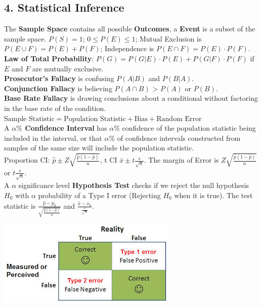 \begin{multicols*}{3}
\subsection{4. Statistical Inference}
The \textbf{Sample Space} contains all possible \textbf{Outcomes}, a \textbf{Event} is a subset of the sample space.
$P(S) = 1$; $0\leq P(E)\leq1$; Mutual Exclusion is $P(E \cup F)=P(E)+P(F)$; Independence is $P(E\cap F)=P(E)\cdot P(F)$.\\
\textbf{Law of Total Probability}: $P(G)=P(G|E)\cdot P(E)+P(G|F)\cdot P(F)$ if $E$ and $F$ are mutually exclusive.\\
\textbf{Prosecutor's Fallacy} is confusing $P(A|B)$ and $P(B|A)$.\\
\textbf{Conjunction Fallacy} is believing $P(A\cap B)$ > $P(A)$ or $P(B)$.\\
\textbf{Base Rate Fallacy} is drawing conclusions about a conditional without factoring in the base rate of the condition.\\
$\text{Sample Statistic}=\text{Population Statistic}+\text{Bias}+\text{Random Error}$\\
A \textbf{$\alpha\%$ Confidence Interval} has $\alpha\%$ confidence of the population statistic being included in the interval, or that $\alpha\%$ of confidence intervals constructed from samples of the same size will include the population statistic.\\ 
Proportion CI: $\hat{p}\pm Z\sqrt{\frac{\hat{p}(1-\hat{p})}{n}}$, t CI $\bar{x}\pm t\frac{s}{\sqrt{n}}$. The margin of Error is $Z\sqrt{\frac{\hat{p}(1-\hat{p})}{n}}$ or $t\frac{s}{\sqrt{n}}$.\\
A $\alpha$ significance level \textbf{Hypothesis Test} checks if we reject the null hypothesis $H_0$ with $\alpha$ probability of a Type I error (Rejecting $H_0$ when it is true). The test statistic is $\frac{\hat{p}-p_0}{\sqrt{\frac{\hat{p}(1-\hat{p})}{n}}}$ and $\frac{\bar{x}-x_0}{\frac{s}{\sqrt{n}}}$.
\begin{center}
    \centering
    \includegraphics[width=0.5\linewidth]{cheatsheet/type1-2_errors.png}
\end{center}
\end{multicols*}